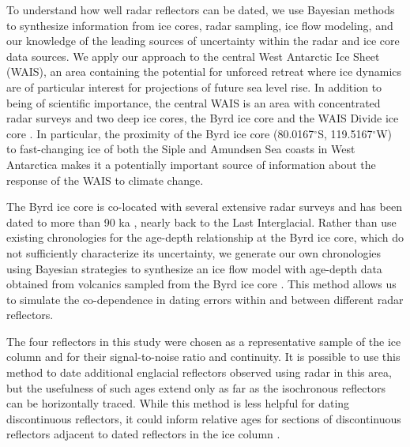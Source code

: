 To understand how well radar reflectors can be dated, we use Bayesian methods %
to synthesize information from ice cores, radar sampling, ice flow modeling, and our knowledge of the leading sources of uncertainty within the radar and ice core data sources. We apply our approach to the central West Antarctic Ice Sheet (WAIS), an area containing the potential for unforced retreat where ice dynamics are of particular interest for projections of future sea level rise. In addition to being of scientific importance, the central WAIS is an area with concentrated radar surveys and two deep ice cores, the Byrd ice core \citep{gow1968} and the WAIS Divide ice core \citep{buizert2015}. In particular, the proximity of the Byrd ice core (80.0167$^\circ$S, 119.5167$^\circ$W) to fast-changing ice of both the Siple and Amundsen Sea coasts in West Antarctica makes it a potentially important source of information about the response of the WAIS to climate change.

The Byrd ice core is co-located with several extensive radar surveys and has been dated to more than 90 ka \citep{blunier2001}, nearly back to the Last Interglacial. Rather than use existing chronologies for the age-depth relationship at the Byrd ice core, which do not sufficiently characterize its uncertainty, we generate our own chronologies using Bayesian strategies to synthesize an ice flow model with age-depth data obtained from volcanics sampled from the Byrd ice core \citep{gow1968,gow1970,hammer1997}. This method allows us to simulate the co-dependence in dating errors within and between different radar reflectors.

The four reflectors in this study were chosen as a representative sample of the ice column and for their signal-to-noise ratio and continuity. It is possible to use this method to date additional englacial reflectors observed using radar in this area, but the usefulness of such ages extend only as far as the isochronous reflectors can be horizontally traced. While this method is less helpful for dating discontinuous reflectors, it could inform relative ages for sections of discontinuous reflectors adjacent to dated reflectors in the ice column  \citep[e.g.][]{macgregor2015}.

